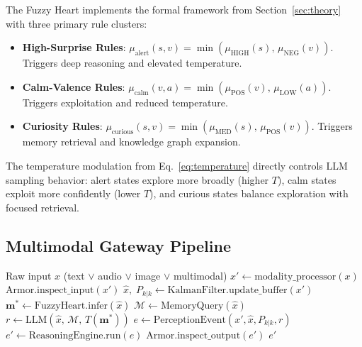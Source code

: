 \documentclass[12pt,a4paper]{article}
\begin{document}
The Fuzzy Heart implements the formal framework from Section~\ref{sec:theory} with three
primary rule clusters:

\begin{itemize}[leftmargin=*]
  \item \textbf{High-Surprise Rules}: $\mu_\text{alert}(s,v) = \min(\mu_\text{HIGH}(s),\,
    \mu_\text{NEG}(v))$. Triggers deep reasoning and elevated temperature.
  \item \textbf{Calm-Valence Rules}: $\mu_\text{calm}(v,a) = \min(\mu_\text{POS}(v),\,
    \mu_\text{LOW}(a))$. Triggers exploitation and reduced temperature.
  \item \textbf{Curiosity Rules}: $\mu_\text{curious}(s,v) = \min(\mu_\text{MED}(s),\,
    \mu_\text{POS}(v))$. Triggers memory retrieval and knowledge graph expansion.
\end{itemize}

The temperature modulation from Eq.~\eqref{eq:temperature} directly controls LLM sampling
behavior: alert states explore more broadly (higher $T$), calm states exploit more
confidently (lower $T$), and curious states balance exploration with focused retrieval.

\subsection{Multimodal Gateway Pipeline}

\begin{algorithm}[H]
\caption{ZANA Multimodal Gateway Request Pipeline}
\begin{algorithmic}[1]
\Require Raw input $x$ (text $\vee$ audio $\vee$ image $\vee$ multimodal)
\State $x' \leftarrow \mathrm{modality\_processor}(x)$
\State $\mathrm{Armor.inspect\_input}(x')$
\State $\hat{x},\; P_{k|k} \leftarrow \mathrm{KalmanFilter.update\_buffer}(x')$
\State $\mathbf{m}^* \leftarrow \mathrm{FuzzyHeart.infer}(\hat{x})$
\State $\mathcal{M} \leftarrow \mathrm{MemoryQuery}(\hat{x})$
\State $r \leftarrow \mathrm{LLM}(\hat{x},\,\mathcal{M},\,T(\mathbf{m}^*))$
\State $e \leftarrow \mathrm{PerceptionEvent}(x', \hat{x}, P_{k|k}, r)$
\State $e' \leftarrow \mathrm{ReasoningEngine.run}(e)$
\State $\mathrm{Armor.inspect\_output}(e')$
\State \Return $e'$
\end{algorithmic}
\end{algorithm}
\end{document}
